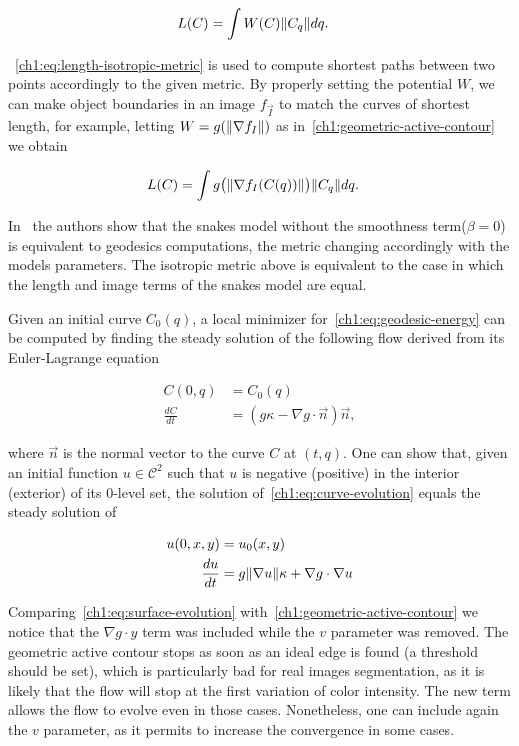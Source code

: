 \begin{align}
	L(C) &= \int{W(C)\lVert C_q\rVert dq}.
	\label{ch1:eq:length-isotropic-metric}
\end{align}

~\cref{ch1:eq:length-isotropic-metric} is used to compute shortest paths between two points accordingly to the given metric. By properly setting the potential $W$, we can make object boundaries in an image $f_{\vec{I}}$ to match the curves of shortest length, for example, letting $W=g(\lVert\nabla f_I\rVert)$ as in~\cref{ch1:geometric-active-contour} we obtain

\begin{align}
	L(C) &= \int{g\big(\lVert\nabla f_I(C(q))\rVert\big)\lVert C_q\rVert dq}.
	\label{ch1:eq:geodesic-energy}
\end{align}

In~\cite{caselles97} the authors show that the snakes model without the smoothness term($\beta=0$) is equivalent to geodesics computations, the metric changing accordingly with the models parameters. The isotropic metric above is equivalent to the case in which the length and image terms of the snakes model are equal.

Given an initial curve $C_0(q)$, a local minimizer for~\cref{ch1:eq:geodesic-energy} can be computed by finding the steady solution of the following flow derived from its Euler-Lagrange equation

\begin{align}
	C(0,q) &= C_0(q)\\
	\frac{dC}{dt} &= (g\kappa - \nabla g \cdot \vec{n})\vec{n},
	\label{ch1:eq:curve-evolution}
\end{align}

where $\vec{n}$ is the normal vector to the curve $C$ at $(t,q)$. One can show that, given an initial function $u \in \mathcal{C}^2$ such that $u$ is negative (positive) in the interior (exterior) of its $0$-level set, the solution of~\cref{ch1:eq:curve-evolution} equals the steady solution of

\begin{align}
	u(0,x,y) &= u_0(x,y) \\
	\frac{du}{dt} &= g\lVert\nabla u\rVert\kappa + \nabla g \cdot \nabla u
	\label{ch1:eq:surface-evolution}
\end{align}

Comparing~\cref{ch1:eq:surface-evolution} with~\cref{ch1:geometric-active-contour} we notice that the $\nabla g \cdot y$ term was included while the $v$ parameter was removed. The geometric active contour stops as soon as an ideal edge is found (a threshold should be set), which is particularly bad for real images segmentation, as it is likely that the flow will stop at the first variation of color intensity. The new term allows the flow to evolve even in those cases. Nonetheless, one can include again the $v$ parameter, as it permits to increase the convergence in some cases.

